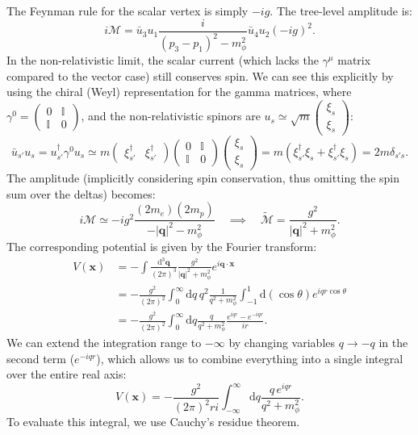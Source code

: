 The Feynman rule for the scalar vertex is simply $-ig$. The tree-level amplitude is:
\[
    i\mathcal{M} = \bar{u}_3 u_1 \frac{i}{(p_3 - p_1)^2 - m_\phi^2} \bar{u}_4 u_2 (-ig)^2.
\]
In the non-relativistic limit, the scalar current (which lacks the $\gamma^{\mu}$ matrix compared to the vector case) still conserves spin. We can see this explicitly by using the chiral (Weyl) representation for the gamma matrices, where $\gamma^0 = \begin{pmatrix} 0 & \mathbb{I} \\ \mathbb{I} & 0 \end{pmatrix}$, and the non-relativistic spinors are $u_s \simeq \sqrt{m} \begin{pmatrix} \xi_s \\ \xi_s \end{pmatrix}$:
\[
    \bar{u}_{s'} u_s = u_{s'}^\dagger \gamma^0 u_s \simeq m \begin{pmatrix} \xi_{s'}^\dagger & \xi_{s'}^\dagger \end{pmatrix} \begin{pmatrix} 0 & \mathbb{I} \\ \mathbb{I} & 0 \end{pmatrix} \begin{pmatrix} \xi_s \\ \xi_s \end{pmatrix} = m (\xi_{s'}^\dagger \xi_s + \xi_{s'}^\dagger \xi_s) = 2m \delta_{s's}.
\]
The amplitude (implicitly considering spin conservation, thus omitting the spin sum over the deltas) becomes:
\[
    i\mathcal{M} \simeq -i g^2 \frac{(2m_e)(2m_p)}{-|\mathbf{q}|^2 - m_\phi^2} \quad \implies \quad \tilde{\mathcal{M}} = \frac{g^2}{|\mathbf{q}|^2 + m_\phi^2}.
\]
The corresponding potential is given by the Fourier transform:
\[
    \begin{aligned}
        V(\mathbf{x}) & = -\int \frac{\mathrm{d}^3\mathbf{q}}{(2\pi)^3} \frac{g^2}{|\mathbf{q}|^2 + m_\phi^2} e^{i\mathbf{q}\cdot\mathbf{x}}                   \\
                      & = -\frac{g^2}{(2\pi)^2} \int_0^\infty \mathrm{d}q \, q^2 \frac{1}{q^2 + m_\phi^2} \int_{-1}^1 \mathrm{d}(\cos\theta) e^{iqr\cos\theta} \\
                      & = -\frac{g^2}{(2\pi)^2} \int_0^\infty \mathrm{d}q \frac{q}{q^2 + m_\phi^2} \frac{e^{iqr} - e^{-iqr}}{ir}.
    \end{aligned}
\]
We can extend the integration range to $-\infty$ by changing variables $q \to -q$ in the second term ($e^{-iqr}$), which allows us to combine everything into a single integral over the entire real axis:
\[
    V(\mathbf{x}) = -\frac{g^2}{(2\pi)^2 r i} \int_{-\infty}^\infty \mathrm{d}q \frac{q \, e^{iqr}}{q^2 + m_\phi^2}.
\]
To evaluate this integral, we use Cauchy's residue theorem.

